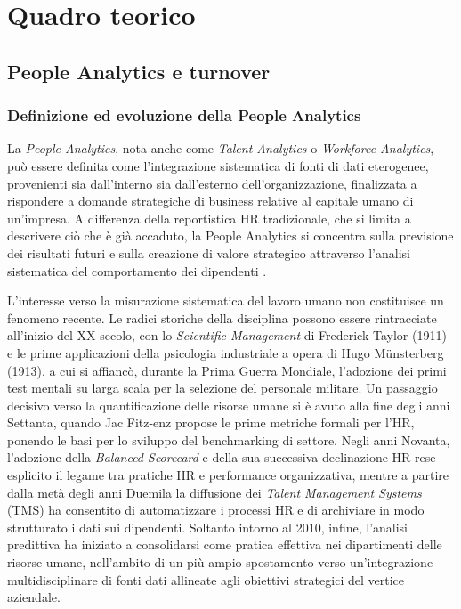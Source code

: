 \chapter{Quadro teorico}
\label{chap:quadro-teorico}
\label{cap:quadro_teorico}

\section{People Analytics e turnover}

\subsection{Definizione ed evoluzione della People Analytics}

La \textit{People Analytics}, nota anche come \textit{Talent Analytics} o \textit{Workforce Analytics}, può essere definita come l'integrazione sistematica di fonti di dati eterogenee, provenienti sia dall'interno sia dall'esterno dell'organizzazione, finalizzata a rispondere a domande strategiche di business relative al capitale umano di un'impresa. A differenza della reportistica HR tradizionale, che si limita a descrivere ciò che è già accaduto, la People Analytics si concentra sulla previsione dei risultati futuri e sulla creazione di valore strategico attraverso l'analisi sistematica del comportamento dei dipendenti \cite{Isson_Harriott_2016}.

L'interesse verso la misurazione sistematica del lavoro umano non costituisce un fenomeno recente. Le radici storiche della disciplina possono essere rintracciate all'inizio del XX secolo, con lo \textit{Scientific Management} di Frederick Taylor (1911) e le prime applicazioni della psicologia industriale a opera di Hugo Münsterberg (1913), a cui si affiancò, durante la Prima Guerra Mondiale, l'adozione dei primi test mentali su larga scala per la selezione del personale militare. Un passaggio decisivo verso la quantificazione delle risorse umane si è avuto alla fine degli anni Settanta, quando Jac Fitz-enz propose le prime metriche formali per l'HR, ponendo le basi per lo sviluppo del benchmarking di settore. Negli anni Novanta, l'adozione della \textit{Balanced Scorecard} e della sua successiva declinazione HR rese esplicito il legame tra pratiche HR e performance organizzativa, mentre a partire dalla metà degli anni Duemila la diffusione dei \textit{Talent Management Systems} (TMS) ha consentito di automatizzare i processi HR e di archiviare in modo strutturato i dati sui dipendenti. Soltanto intorno al 2010, infine, l'analisi predittiva ha iniziato a consolidarsi come pratica effettiva nei dipartimenti delle risorse umane, nell'ambito di un più ampio spostamento verso un'integrazione multidisciplinare di fonti dati allineate agli obiettivi strategici del vertice aziendale.

